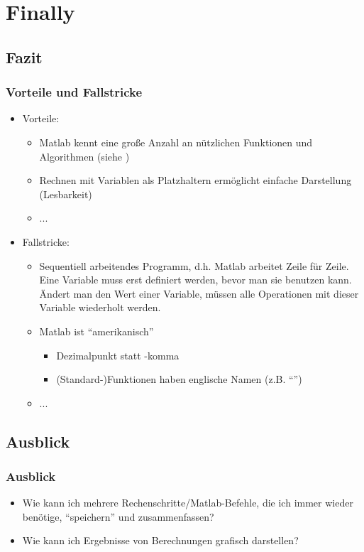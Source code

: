     \section{Finally}

    \subsection{Fazit}
    \begin{frame}
      \frametitle{Vorteile und Fallstricke}
      \begin{itemize}
          \item Vorteile:
          \begin{itemize}
              \item Matlab kennt eine große Anzahl an nützlichen Funktionen und Algorithmen (siehe )
              \item Rechnen mit Variablen als Platzhaltern ermöglicht einfache Darstellung (Lesbarkeit)
              \item ...
          \end{itemize}
          \item Fallstricke:
          \begin{itemize}
              \item Sequentiell arbeitendes Programm, d.h. Matlab arbeitet Zeile für Zeile. Eine Variable muss erst definiert werden,
              bevor man sie benutzen kann. Ändert man den Wert einer Variable, müssen alle Operationen mit dieser Variable wiederholt werden.
              \item Matlab ist ``amerikanisch''
              \begin{itemize}
                  \item Dezimalpunkt statt -komma
                  \item (Standard-)Funktionen haben englische Namen (z.B. ``'')
              \end{itemize}
              \item ...
          \end{itemize}
      \end{itemize}
    \end{frame}

    \subsection{Ausblick}
    \begin{frame}
      \frametitle{Ausblick}
      \begin{itemize}
          \item Wie kann ich mehrere Rechenschritte/Matlab-Befehle, die ich immer wieder benötige, ``speichern'' und zusammenfassen?
          \item Wie kann ich Ergebnisse von Berechnungen grafisch darstellen?
      \end{itemize}
    \end{frame}


